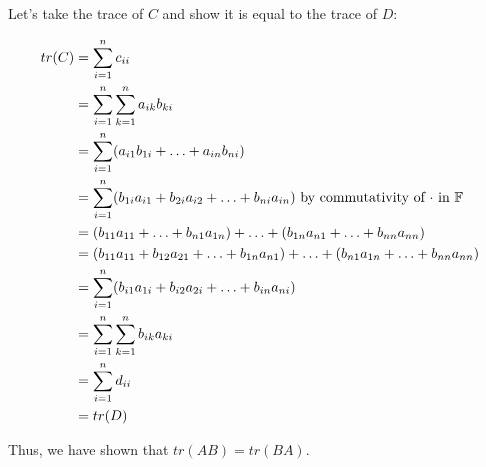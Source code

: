 {	Let's take the trace of \(C\) and show it is equal to the trace of \(D\):

	\begin{align*}
		tr(C) & = \sum_{i=1}^n c_{ii} \\
		             & = \sum_{i=1}^n \sum_{k=1}^n a_{ik}b_{ki} \\
			     &= \sum_{i=1}^n (a_{i1}b_{1i} + \ldots + a_{in}b_{ni}) \\
			     &= \sum_{i=1}^n (b_{1i}a_{i1} + b_{2i}a_{i2} + \ldots + b_{ni}a_{in}) \text{ by commutativity of \(\cdot\) in } \FF \\
			     &= (b_{11}a_{11} + \ldots + b_{n1}a_{1n}) + \ldots + (b_{1n}a_{n1} + \ldots + b_{nn}a_{nn}) \\
			     &= (b_{11}a_{11} + b_{12}a_{21} + \ldots + b_{1n}a_{n1}) + \ldots + (b_{n1}a_{1n} + \ldots + b_{nn}a_{nn}) \\
			     &= \sum_{i=1}^n (b_{i1}a_{1i} + b_{i2}a_{2i} + \ldots + b_{in}a_{ni}) \\
			     &= \sum_{i=1}^n \sum_{k=1}^n b_{ik}a_{ki} \\
			     &= \sum_{i=1}^n d_{ii} \\
			     &= tr(D)
	\end{align*}

	Thus, we have shown that \(tr(AB) = tr(BA)\).
}

